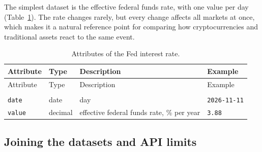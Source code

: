 \documentclass[
]{article}
\begin{document}
The simplest dataset is the effective federal funds rate, with one value per day (Table~\ref{tbl-fed}). The rate changes rarely, but every change affects all markets at once, which makes it a natural reference point for comparing how cryptocurrencies and traditional assets react to the same event.

\begin{longtable}[]{@{}
  >{\raggedright\arraybackslash}p{}
  >{\raggedright\arraybackslash}p{}
  >{\raggedright\arraybackslash}p{}
  >{\raggedright\arraybackslash}p{}@{}}
\toprule\noalign{}
\begin{minipage}[b]{\linewidth}\raggedright
Attribute
\end{minipage} & \begin{minipage}[b]{\linewidth}\raggedright
Type
\end{minipage} & \begin{minipage}[b]{\linewidth}\raggedright
Description
\end{minipage} & \begin{minipage}[b]{\linewidth}\raggedright
Example
\end{minipage} \\
\midrule\noalign{}
\endfirsthead
\toprule\noalign{}
\begin{minipage}[b]{\linewidth}\raggedright
Attribute
\end{minipage} & \begin{minipage}[b]{\linewidth}\raggedright
Type
\end{minipage} & \begin{minipage}[b]{\linewidth}\raggedright
Description
\end{minipage} & \begin{minipage}[b]{\linewidth}\raggedright
Example
\end{minipage} \\
\midrule\noalign{}
\endhead
\bottomrule\noalign{}
\caption{Attributes of the Fed interest rate.}\label{tbl-fed}\tabularnewline
\endlastfoot
\texttt{date} & date & day & \texttt{2026-\allowbreak{}11-\allowbreak{}11} \\
\midrule\noalign{}
\texttt{value} & decimal & effective federal funds rate, \% per year & \texttt{3.\allowbreak{}88} \\
\end{longtable}

\subsection{Joining the datasets and API limits}\label{joining-the-datasets-and-api-limits}
\end{document}
